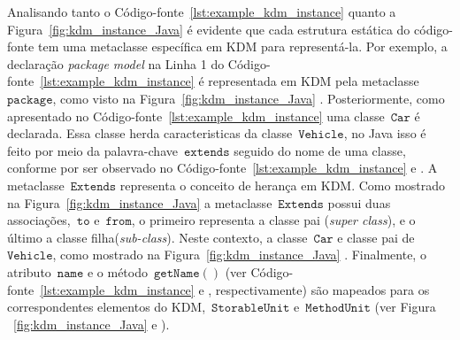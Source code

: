 Analisando tanto o Código-fonte~\ref{lst:example_kdm_instance} quanto a Figura~\ref{fig:kdm_instance_Java} é evidente que cada estrutura estática do código-fonte tem uma metaclasse específica em KDM para representá-la. Por exemplo, a declaração \textit{package} \textit{model} na Linha 1 do Código-fonte~\ref{lst:example_kdm_instance}  é representada em KDM pela metaclasse ~$\mathtt{package}$, como visto na Figura~\ref{fig:kdm_instance_Java} . Posteriormente, como apresentado no Código-fonte~\ref{lst:example_kdm_instance}  uma classe~$\mathtt{Car}$ é declarada. Essa classe herda caracteristicas da classe~$\mathtt{Vehicle}$, no Java isso é feito por meio da palavra-chave~$\mathtt{extends}$ seguido do nome de uma classe, conforme por ser observado no Código-fonte~\ref{lst:example_kdm_instance}  e . A metaclasse~$\mathtt{Extends}$ representa o conceito de herança em KDM. Como mostrado na Figura~\ref{fig:kdm_instance_Java}  a metaclasse~$\mathtt{Extends}$ possui duas associações,~$\mathtt{to}$ e~$\mathtt{from}$, o primeiro representa a classe pai (\textit{super class}), e o último a classe filha(\textit{sub-class}). Neste contexto, a classe~$\mathtt{Car}$ e classe pai de~$\mathtt{Vehicle}$, como mostrado na Figura~\ref{fig:kdm_instance_Java} . Finalmente, o atributo~$\mathtt{name}$ e o método~$\mathtt{getName()}$ (ver Código-fonte~\ref{lst:example_kdm_instance}  e , respectivamente) são mapeados para os correspondentes elementos do KDM,~$\mathtt{StorableUnit}$ e~$\mathtt{MethodUnit}$ (ver Figura ~\ref{fig:kdm_instance_Java}  e ).



